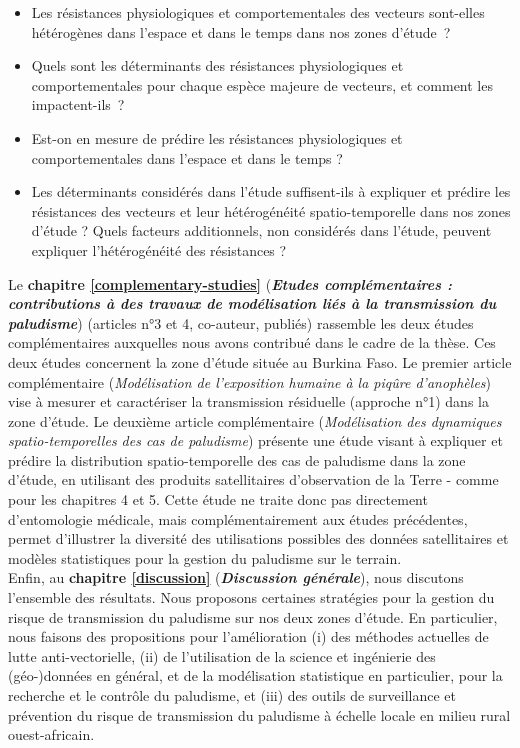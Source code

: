 \documentclass[12pt,twoside]{reedthesis}
\providecommand{\tightlist}{%
  \setlength{\itemsep}{0pt}\setlength{\parskip}{0pt}}
\begin{document}
\begin{itemize}
\tightlist
\item
  Les résistances physiologiques et comportementales des vecteurs sont-elles hétérogènes dans l'espace et dans le temps dans nos zones d'étude~?
\item
  Quels sont les déterminants des résistances physiologiques et comportementales pour chaque espèce majeure de vecteurs, et comment les impactent-ils~?
\item
  Est-on en mesure de prédire les résistances physiologiques et comportementales dans l'espace et dans le temps ?
\item
  Les déterminants considérés dans l'étude suffisent-ils à expliquer et prédire les résistances des vecteurs et leur hétérogénéité spatio-temporelle dans nos zones d'étude ? Quels facteurs additionnels, non considérés dans l'étude, peuvent expliquer l'hétérogénéité des résistances ?\\
\end{itemize}
Le \textbf{chapitre \ref{complementary-studies}} (\textbf{\emph{Etudes complémentaires : contributions à des travaux de modélisation liés à la transmission du paludisme}}) (articles n°3 et 4, co-auteur, publiés) rassemble les deux études complémentaires auxquelles nous avons contribué dans le cadre de la thèse. Ces deux études concernent la zone d'étude située au Burkina Faso. Le premier article complémentaire (\emph{Modélisation de l'exposition humaine à la piqûre d'anophèles}) vise à mesurer et caractériser la transmission résiduelle (approche n°1) dans la zone d'étude. Le deuxième article complémentaire (\emph{Modélisation des dynamiques spatio-temporelles des cas de paludisme}) présente une étude visant à expliquer et prédire la distribution spatio-temporelle des cas de paludisme dans la zone d'étude, en utilisant des produits satellitaires d'observation de la Terre - comme pour les chapitres 4 et 5. Cette étude ne traite donc pas directement d'entomologie médicale, mais complémentairement aux études précédentes, permet d'illustrer la diversité des utilisations possibles des données satellitaires et modèles statistiques pour la gestion du paludisme sur le terrain.\\

Enfin, au \textbf{chapitre \ref{discussion}} (\textbf{\emph{Discussion générale}}), nous discutons l'ensemble des résultats. Nous proposons certaines stratégies pour la gestion du risque de transmission du paludisme sur nos deux zones d'étude. En particulier, nous faisons des propositions pour l'amélioration (i) des méthodes actuelles de lutte anti-vectorielle, (ii) de l'utilisation de la science et ingénierie des (géo-)données en général, et de la modélisation statistique en particulier, pour la recherche et le contrôle du paludisme, et (iii) des outils de surveillance et prévention du risque de transmission du paludisme à échelle locale en milieu rural ouest-africain.
\end{document}
